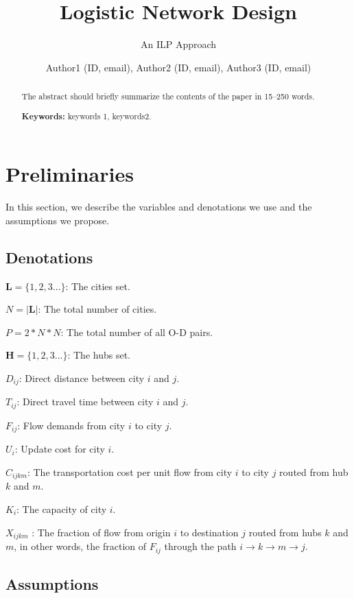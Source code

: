 \documentclass{llncs}
\title{Logistic Network Design}
\subtitle{An ILP Approach \vspace{-3mm}}
\author{Author1 (ID, email), Author2 (ID, email), Author3 (ID, email)}
\institute{Department of Computer Science, \\ Shanghai Jiao Tong University, Shanghai, China}
\begin{document}
	
	
	
	\maketitle
	\begin{abstract}\vspace{-5mm}
		The abstract should briefly summarize the contents of the paper in
		15--250 words.
		
		\textbf{Keywords:} keywords 1, keywords2.
	\end{abstract}
	
\section{Preliminaries}
	In this section, we describe the variables and denotations we use and the assumptions we propose.
\subsection{Denotations}
	
	$\mathbf{L} = \{1,2,3...\}$: The cities set.
	
	$N = |\mathbf{L}|$: The total number of cities.
	
	$P = 2 * N * N$: The total number of all O-D pairs.
	
	$\mathbf{H} = \{1,2,3...\}$: The hubs set. 
	
	$D_{ij}$: Direct distance between city $i$ and $j$.
	
	$T_{ij}$: Direct travel time between city $i$ and $j$.
	
	$F_{ij}$: Flow demands from city $i$ to city $j$.
	
	$U_i$: Update cost for city $i$.
	
	$C_{ijkm}$: The transportation cost per unit flow from city $i$ to city $j$ routed from hub $k$ and $m$.

	$K_{i}$: The capacity of city $i$.
	
	$X_{ijkm}$ : The fraction of flow from origin $i$ to destination $j$ routed from hubs $k$ and $m$, in other words, the fraction of $F_{ij}$ through the path $i \rightarrow k \rightarrow m\rightarrow j$.
\subsection{Assumptions}
	
\end{document}
